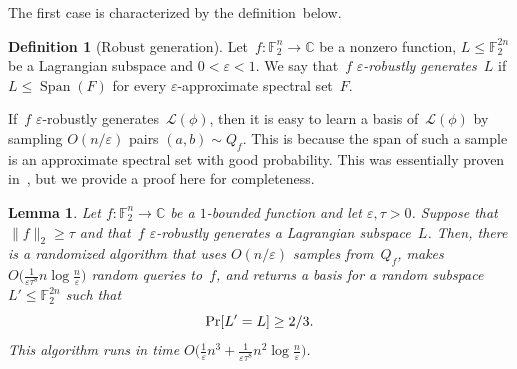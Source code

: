 \documentclass[11pt]{amsart}
\renewcommand{\Pr}{\mathop{\mbox{\rm Pr}}}
\newcommand{\C}{\mathbb{C}} %
\newcommand{\F}{\mathbb{F}} %
\newcommand{\Lcal}{\mathcal{L}}
\DeclareMathOperator{\vspan}{Span} %
\newcommand{\eps}{\varepsilon}
\theoremstyle{plain}
\newtheorem{lemma}[theorem]{Lemma}
\theoremstyle{definition}
\newtheorem{definition}[theorem]{Definition}
\theoremstyle{remark}
\begin{document}
The first case is characterized by the definition~below.

\begin{definition}[Robust generation]
    Let~$f:\F_2^n\to \C$ be a nonzero function, $L \leq \F_2^{2n}$ be a Lagrangian subspace and $0<\eps<1$.
    We say that~$f$ \emph{$\eps$-robustly generates~$L$} if $L \leq \vspan(F)$ for every $\eps$-approximate spectral set~$F$.
\end{definition}

If~$f$ $\eps$-robustly generates~$\Lcal(\phi)$, then it is easy to learn a basis of~$\Lcal(\phi)$ by sampling $O(n/\eps)$ pairs $(a, b) \sim Q_f$.
This is because the span of such a sample is an approximate spectral set with good probability.
This was essentially proven in~\cite{chen2024stabilizer}, but we provide a proof here for completeness.

\begin{lemma}
\label{lem:robustgen}
    Let $f:\F_2^n\to \C$ be a $1$-bounded function and let $\eps, \tau>0$.
    Suppose that $\|f\|_2\geq \tau$ and that~$f$ $\eps$-robustly generates a Lagrangian subspace~$L$.
    Then, there is a randomized algorithm that uses $O(n/\eps)$ samples from~$Q_f$, makes $O\big(\tfrac{1}{\eps \tau^8} n\log \tfrac{n}{\eps}\big)$ random queries to~$f$, and returns a basis for a random subspace~$L'\leq \F_2^{2n}$ such that
    $$\Pr[L'=L] \geq 2/3.$$
    This algorithm runs in time $O\big(\tfrac{1}{\eps} n^3 + \tfrac{1}{\eps \tau^8} n^2\log \tfrac{n}{\eps}\big)$.
\end{lemma}
\end{document}
